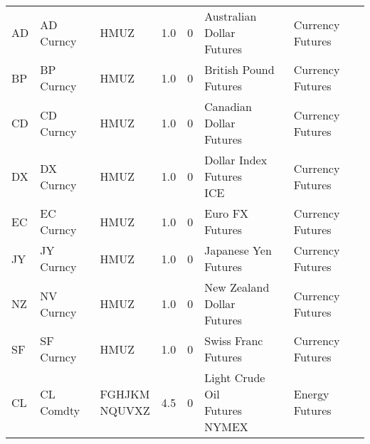 \begin{longtable}{lllrrll}
\bottomrule
\endlastfoot
                   AD &              AD Curncy &                      HMUZ &                               1.0 &                        0 &                      \makecell{Australian Dollar\\Futures} &        Currency Futures \\
                   BP &              BP Curncy &                      HMUZ &                               1.0 &                        0 &                          \makecell{British Pound\\Futures} &        Currency Futures \\
                   CD &              CD Curncy &                      HMUZ &                               1.0 &                        0 &                        \makecell{Canadian Dollar\\Futures} &        Currency Futures \\
                   DX &              DX Curncy &                      HMUZ &                               1.0 &                        0 &                       \makecell{Dollar Index Futures\\ICE} &        Currency Futures \\
                   EC &              EC Curncy &                      HMUZ &                               1.0 &                        0 &                                            Euro FX Futures &        Currency Futures \\
                   JY &              JY Curncy &                      HMUZ &                               1.0 &                        0 &                                       Japanese Yen Futures &        Currency Futures \\
                   NZ &              NV Curncy &                      HMUZ &                               1.0 &                        0 &                     \makecell{New Zealand Dollar\\Futures} &        Currency Futures \\
                   SF &              SF Curncy &                      HMUZ &                               1.0 &                        0 &                                        Swiss Franc Futures &        Currency Futures \\
                   CL &              CL Comdty & \makecell{FGHJKM\\NQUVXZ} &                               4.5 &                        0 &                  \makecell{Light Crude Oil\\Futures NYMEX} &          Energy Futures \\

\end{longtable}
